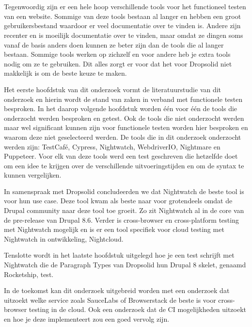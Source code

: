 \chapter*{}
Tegenwoordig zijn er een hele hoop verschillende tools voor het functioneel testen van een website. Sommige van deze tools bestaan al langer en hebben een groot gebruikersbestand waardoor er veel documentatie over te vinden is. Andere zijn recenter en is moeilijk documentatie over te vinden, maar omdat ze dingen soms vanaf de basis anders doen kunnen ze beter zijn dan de tools die al langer bestaan. Sommige tools werken op zichzelf en voor andere heb je extra tools nodig om ze te gebruiken. Dit alles zorgt er voor dat het voor Dropsolid niet makkelijk is om de beste keuze te maken.

Het eerste hoofdstuk van dit onderzoek vormt de literatuurstudie van dit onderzoek en hierin wordt de stand van zaken in verband met functionele testen besproken. In het daarop volgende hoofdstuk worden één voor één de tools die onderzocht werden besproken en getest. Ook de tools die niet onderzocht werden maar wel significant kunnen zijn voor functionele testen worden hier besproken en waarom deze niet geselecteerd werden. De tools die in dit onderzoek onderzocht werden zijn: TestCafé, Cypress, Nightwatch, WebdriverIO, Nightmare en Puppeteer. Voor elk van deze tools werd een test geschreven die hetzelfde doet om een idee te krijgen over de verschillende uitvoeringstijden en om de syntax te kunnen vergelijken.

In samenspraak met Dropsolid concludeerden we dat Nightwatch de beste tool is voor hun use case. Deze tool kwam als beste naar voor grotendeels omdat de Drupal community naar deze tool toe groeit. Zo zit Nightwatch al in de core van de pre-release van Drupal 8.6. Verder is cross-browser en cross-platform testing met Nightwatch mogelijk en is er een tool specifiek voor cloud testing met Nightwatch in ontwikkeling, Nightcloud.

Tenslotte wordt in het laatste hoofdstuk uitgelegd hoe je een test schrijft met Nightwatch die de \gls{Paragraph Types} van Dropsolid hun Drupal 8 skelet, genaamd Rocketship, test.

In de toekomst kan dit onderzoek uitgebreid worden met een onderzoek dat uitzoekt welke service zoals SauceLabs of Browserstack de beste is voor cross-browser testing in de cloud. Ook een onderzoek dat de \gls{CI} mogelijkheden uitzoekt en hoe je deze implementeert zou een goed vervolg zijn.
